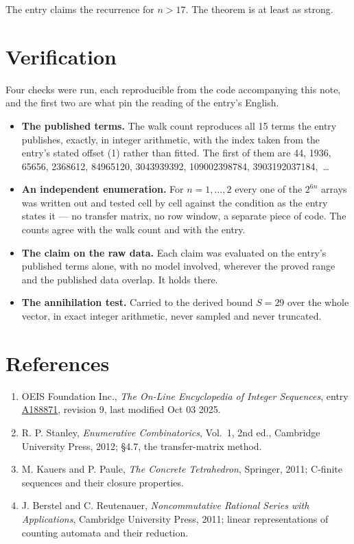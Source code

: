 \documentclass[11pt]{article}
\theoremstyle{definition}
\begin{document}
The entry claims the recurrence for $n > 17$. The theorem is at least as strong.

\section{Verification}

Four checks were run, each reproducible from the code accompanying this note, and the first two are what pin the reading of the entry's English.

\begin{itemize}

\item {\bfseries The published terms.} The walk count reproduces all 15 terms the entry publishes, exactly, in integer arithmetic, with the index taken from the entry's stated offset (1) rather than fitted. The first of them are 44, 1936, 65656, 2368612, 84965120, 3043939392, 109002398784, 3903192037184,~\dots

\item {\bfseries An independent enumeration.} For $n = 1,\dots,2$ every one of the $2^{6n}$ arrays was written out and tested cell by cell against the condition as the entry states it --- no transfer matrix, no row window, a separate piece of code. The counts agree with the walk count and with the entry.

\item {\bfseries The claim on the raw data.} Each claim was evaluated on the entry's published terms alone, with no model involved, wherever the proved range and the published data overlap. It holds there.

\item {\bfseries The annihilation test.} Carried to the derived bound $S = 29$ over the whole vector, in exact integer arithmetic, never sampled and never truncated.

\end{itemize}

\section{References}

\begin{enumerate}

\item OEIS Foundation Inc., \emph{The On-Line Encyclopedia of Integer Sequences}, entry \href{https://oeis.org/A188871}{A188871}, revision 9, last modified Oct 03 2025.

\item R. P. Stanley, \emph{Enumerative Combinatorics}, Vol.~1, 2nd ed., Cambridge University Press, 2012; \S4.7, the transfer-matrix method.

\item M. Kauers and P. Paule, \emph{The Concrete Tetrahedron}, Springer, 2011; C-finite sequences and their closure properties.

\item J. Berstel and C. Reutenauer, \emph{Noncommutative Rational Series with Applications}, Cambridge University Press, 2011; linear representations of counting automata and their reduction.

\end{enumerate}
\end{document}

